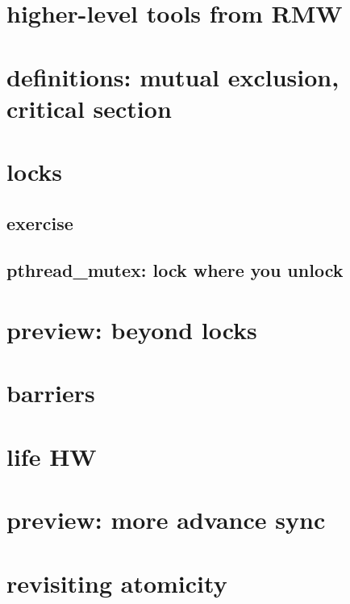 \section{higher-level tools from RMW}


\section{definitions: mutual exclusion, critical section}


\section{locks}




\subsection{exercise}


\subsection{pthread\_mutex: lock where you unlock}


\section{preview: beyond locks}


\section{barriers}


\section{life HW}



\section{preview: more advance sync}


\section{revisiting atomicity}
